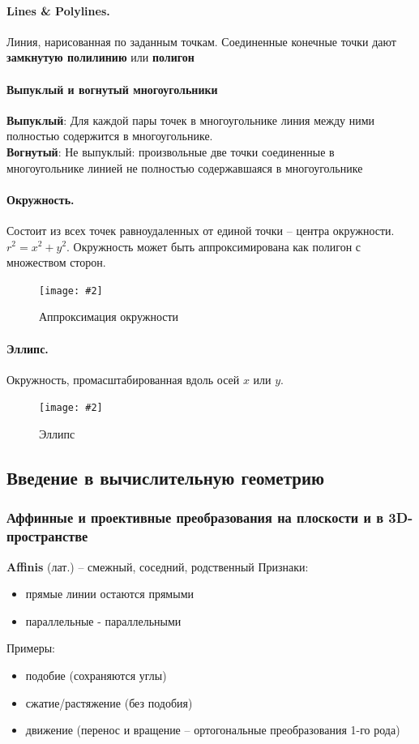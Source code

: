 \documentclass[a4paper, 14pt]{extarticle}
\newcommand{\screenshot}[3]{
	\begin{figure}[h]
		\centering
		\texttt{[image: \#2]}
		\caption{#3}
	\end{figure}
}
\begin{document}
\paragraph{Lines \& Polylines. } Линия, нарисованная по заданным точкам. Соединенные конечные точки дают \textbf{замкнутую полилинию} или \textbf{полигон}
\paragraph{Выпуклый и вогнутый многоугольники}
\textbf{Выпуклый}: Для каждой пары точек в многоугольнике линия между ними полностью содержится в многоугольнике.\\
\textbf{Вогнутый}: Не выпуклый: произвольные две точки соединенные в многоугольнике линией не полностью содержавшаяся в многоугольнике

\paragraph{Окружность. }  Состоит из всех точек равноудаленных от единой точки – центра окружности. $r^2 = x^2 + y^2$. Окружность может быть аппроксимирована как полигон с множеством сторон.
\screenshot{width=\textwidth}{l3/S003.jpg}{Аппроксимация окружности}

\paragraph{Эллипс. } Окружность, промасштабированная вдоль осей $x$ или $y$.
\screenshot{width=\textwidth}{l3/S004.jpg}{Эллипс}

\subsection{Введение в вычислительную геометрию}
\subsubsection{Аффинные и проективные преобразования на 	плоскости и в 3D-пространстве}
\textbf{Affinis} (лат.) – смежный, соседний, родственный
Признаки:
\begin{itemize}
	\item прямые линии остаются прямыми
	\item параллельные - параллельными
\end{itemize}
Примеры:
\begin{itemize}
	\item подобие (сохраняются углы)
	\item сжатие/растяжение (без подобия)
	\item движение (перенос и вращение – ортогональные преобразования 1-го рода)
\end{itemize}
\end{document}
